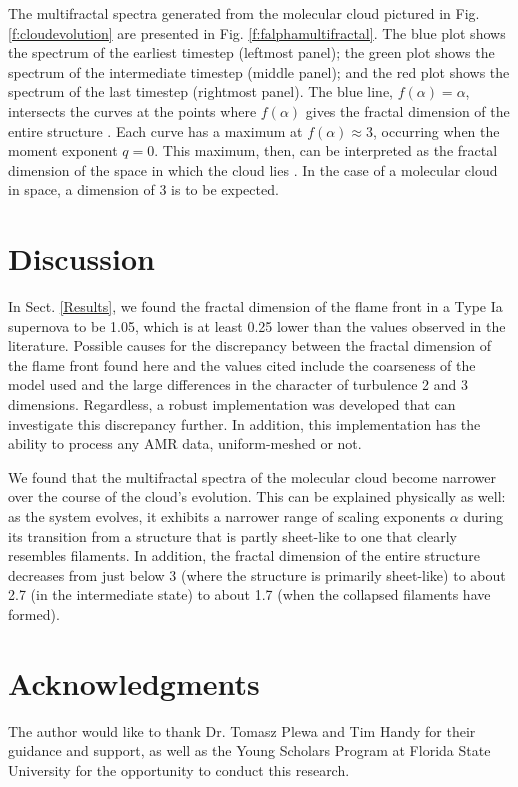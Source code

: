 \documentclass{emulateapj}
\begin{document}
The multifractal spectra generated from the molecular cloud pictured in Fig. \ref{f:cloudevolution} are presented in Fig. \ref{f:falphamultifractal}. The blue plot shows the spectrum of the earliest timestep (leftmost panel); the green plot shows the spectrum of the intermediate timestep (middle panel); and the red plot shows the spectrum of the last timestep (rightmost panel). The blue line, $f(\alpha) = \alpha $, intersects the curves at the points where $f(\alpha)$ gives the fractal dimension of the entire structure \citep{mandelbrotmultifractal}. Each curve has a maximum at $f(\alpha) \approx 3$, occurring when the moment exponent $q = 0$. This maximum, then, can be interpreted as the fractal dimension of the space in which the cloud lies \citep{Schroeder}. In the case of a molecular cloud in space, a dimension of 3 is to be expected. 

\section{Discussion}\label{Discussion}
In Sect. \ref{Results}, we found the fractal dimension of the flame front in a Type Ia supernova to be 1.05, which is at least 0.25 lower than the values observed in the literature. Possible causes for the discrepancy between the fractal dimension of the flame front found here and the values cited include the coarseness of the model used and the large differences in the character of turbulence 2 and 3 dimensions. Regardless, a robust implementation was developed that can investigate this discrepancy further. In addition, this implementation has the ability to process any AMR data, uniform-meshed or not.
 
We found that the multifractal spectra of the molecular cloud become narrower over the course of the cloud's evolution. This can be explained physically as well: as the system evolves, it exhibits a narrower range of scaling exponents $ \alpha $ during its transition from a structure that is partly sheet-like to one that clearly resembles filaments. In addition, the fractal dimension of the entire structure decreases from just below 3 (where the structure is primarily sheet-like) to about 2.7 (in the intermediate state) to about 1.7 (when the collapsed filaments have formed).

\section{Acknowledgments}\label{s:ack}
The author would like to thank Dr. Tomasz Plewa and Tim Handy for their guidance and support, as well as the Young Scholars Program at Florida State University for the opportunity to conduct this research.
%
%


%
%
%
\end{document}
